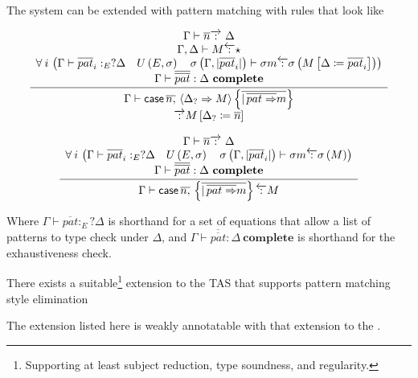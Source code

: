 The \bidir{} system can be extended with pattern matching with rules that look like 

\[
\frac{\begin{array}{c}
\Gamma\vdash\overline{n}\overrightarrow{\,:\,}\ \Delta\\
\Gamma,\Delta\vdash M\overleftarrow{\,:\,}\star\\
\forall\:i\,\left(\Gamma\vdash\overline{pat}_{i}:_{E}?\Delta\quad U\left(E,\sigma\right)\quad\sigma\left(\Gamma,|\overline{pat}_{i}|\right)\vdash\sigma m\overleftarrow{\,:\,}\sigma\left(M\left[\Delta\coloneqq\overline{pat}_{i}\right]\right)\right)\\
\Gamma\vdash\overline{\overline{pat}}:\Delta\ \mathbf{complete}
\end{array}}{\begin{array}{c}
\Gamma\vdash \mathsf{case}{} \,\overline{n,}\,\left\langle \Delta_{?}\Rightarrow M\right\rangle \left\{ \overline{|\,\overline{pat\Rightarrow}m}\right\} \\
\overrightarrow{\,:\,}M\left[\Delta_{?}\coloneqq\overline{n}\right]
\end{array}}
\]


\[
\frac{\begin{array}{c}
\Gamma\vdash\overline{n}\overrightarrow{\,:\,}\ \Delta\\
\forall\:i\,\left(\Gamma\vdash\overline{pat}_{i}:_{E}?\Delta\quad U\left(E,\sigma\right)\quad\sigma\left(\Gamma,|\overline{pat}_{i}|\right)\vdash\sigma m\overleftarrow{\,:\,}\sigma\left(M\right)\right)\\
\Gamma\vdash\overline{\overline{pat}}:\Delta\ \mathbf{complete}
\end{array}}{\Gamma\vdash \mathsf{case}{} \,\overline{n,}\,\left\{ \overline{|\,\overline{pat\Rightarrow}m}\right\} \overleftarrow{\,:\,}M}
\]

Where $\Gamma\vdash\overline{pat}:_{E}?\Delta$ is shorthand for a set of equations that allow a list of patterns to type check under $\Delta$, 
  and $\Gamma\vdash\overline{\overline{pat}}:\Delta\ \mathbf{complete}$ is shorthand for the exhaustiveness check. 
\begin{conjecture}
There exists a suitable\footnote{
  Supporting at least subject reduction, type soundness, and regularity.
} extension to the \slang{} \ac{TAS} that supports pattern matching style elimination
\end{conjecture}
\begin{conjecture}
The \bidir{} extension listed here is weakly annotatable with that extension to the \slang{}.
\end{conjecture}
 
